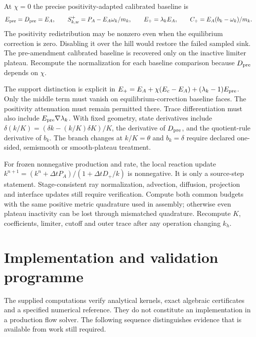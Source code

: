 \documentclass[11pt,a4paper]{article}
\numberwithin{equation}{section}
\begin{document}
At $\chi=0$ the precise positivity-adapted calibrated baseline is
\begin{equation}
 E_{\rm pre}=D_{\rm pre}=E_A,\qquad
 S_{k,w}^+=P_A-E_A\omega_k/m_k,\qquad
 E_+=\lambda_kE_A,\qquad C_+=E_A(b_k-\omega_k)/m_k.
 \label{eq:wj-wall-positive-baseline}
\end{equation}
The positivity redistribution may be nonzero even when the equilibrium
correction is zero. Disabling it over the hill would restore the failed
sampled sink. The pre-amendment calibrated baseline is recovered only on
the inactive limiter plateau. Recompute the normalization for each
baseline comparison because $D_{\rm pre}$ depends on $\chi$.

The support distinction is explicit in
$E_+=E_A+\chi(E_c-E_A)+(\lambda_k-1)E_{\rm pre}$.
Only the middle term must vanish on equilibrium-correction baseline
faces. The positivity attenuation must remain permitted there.
Trace differentiation must also include $E_{\rm pre}\nabla\lambda_k$.
With fixed geometry, state derivatives include
$\delta(k/K)=(\delta k-(k/K)\delta K)/K$, the derivative of
$D_{\rm pre}$, and the quotient-rule derivative of $b_k$.
The branch changes at $k/K=\theta$ and $b_k=\delta$ require declared
one-sided, semismooth or smooth-plateau treatment.

For frozen nonnegative production and rate, the local reaction update
$k^{n+1}=(k^n+\Delta t P_A)/(1+\Delta t D_+/k)$ is nonnegative.
It is only a source-step statement. Stage-consistent ray normalization,
advection, diffusion, projection and interface updates still require
verification. Compute both common budgets with the same positive metric
quadrature used in assembly; otherwise even plateau inactivity can be
lost through mismatched quadrature. Recompute $K$, coefficients, limiter,
cutoff and outer trace after any operation changing $k_h$.


\section{Implementation and validation programme}
\label{sec:validation}
The supplied computations verify analytical kernels, exact algebraic
certificates and a specified numerical reference. They do not constitute
an implementation in a production flow solver. The following sequence
distinguishes evidence that is available from work still required.
\end{document}
